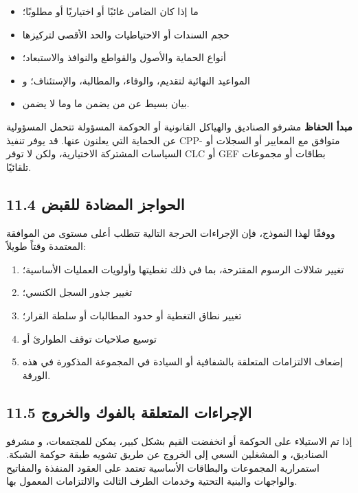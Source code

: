 \documentclass[11pt]{article}
\begin{document}
\begin{itemize}[leftmargin=*]
\item ما إذا كان الضامن غائبًا أو اختياريًا أو مطلوبًا؛
\item حجم السندات أو الاحتياطيات والحد الأقصى لتركيزها
\item أنواع الحماية والأصول والقواطع والنوافذ والاستبعاد؛
\item المواعيد النهائية لتقديم، والوفاء، والمطالبة، والإستئناف؛ و
\item بيان بسيط عن من يضمن ما وما لا يضمن.
\end{itemize}
\textbf{مبدأ الحفاظ} مشرفو الصناديق والهياكل القانونية أو الحوكمة المسؤولة تتحمل المسؤولية عن الحماية التي يعلنون عنها. قد يوفر تنفيذ CPP- متوافق مع المعايير أو السجلات أو السياسات المشتركة الاختيارية، ولكن لا توفر CLC أو GEF بطاقات أو مجموعات تلقائيًا.

\subsection*{11.4 الحواجز المضادة للقبض}

ووفقًا لهذا النموذج، فإن الإجراءات الحرجة التالية تتطلب أعلى مستوى من الموافقة المعتمدة وقتاً طويلاً:

\begin{enumerate}[leftmargin=*]
\item تغيير شلالات الرسوم المقترحة، بما في ذلك تغطيتها وأولويات العمليات الأساسية؛
\item تغيير جذور السجل الكنسي؛
\item تغيير نطاق التغطية أو حدود المطالبات أو سلطة القرار؛
\item توسيع صلاحيات توقف الطوارئ أو
\item إضعاف الالتزامات المتعلقة بالشفافية أو السيادة في المجموعة المذكورة في هذه الورقة.
\end{enumerate}
\subsection*{11.5 الإجراءات المتعلقة بالفوك والخروج}

إذا تم الاستيلاء على الحوكمة أو انخفضت القيم بشكل كبير، يمكن للمجتمعات، و مشرفو الصناديق، و المشغلين السعي إلى الخروج عن طريق تشويه طبقة حوكمة الشبكة. استمرارية المجموعات والبطاقات الأساسية تعتمد على العقود المنفذة والمفاتيح والواجهات والبنية التحتية وخدمات الطرف الثالث والالتزامات المعمول بها.
\end{document}
